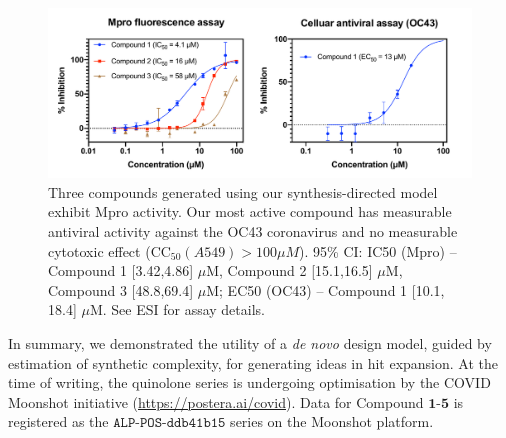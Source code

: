 \begin{figure}
\centering
         \includegraphics[scale=0.36]{data_curve.pdf}
    \caption{Three compounds generated using our synthesis-directed model exhibit Mpro activity. Our most active compound has measurable antiviral activity against the OC43 coronavirus and no measurable cytotoxic effect ($\mathrm{CC}_{50} (A549)>100 \mu M$). 95\% CI: IC50 (Mpro) -- Compound 1 [3.42,4.86] $\mu$M, Compound 2 [15.1,16.5] $\mu$M, Compound 3 [48.8,69.4] $\mu$M; EC50 (OC43) -- Compound 1 [10.1, 18.4] $\mu$M. See ESI for assay details.}
    \label{fig:data}
\end{figure}

In summary, we demonstrated the utility of a \emph{de novo} design model, guided by estimation of synthetic complexity, for generating ideas in hit expansion. At the time of writing, the quinolone series is undergoing optimisation by the COVID Moonshot initiative (\url{https://postera.ai/covid}). Data for Compound $\mathbf{1}$-$\mathbf{5}$ is registered as the $\texttt{ALP-POS-ddb41b15}$ series on the Moonshot platform. 




